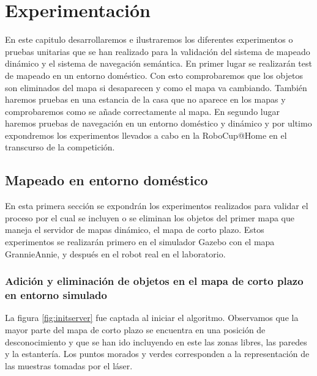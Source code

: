 \chapter{Experimentación}
\label{cap:experimentacion}
En este capitulo desarrollaremos e ilustraremos los diferentes experimentos o pruebas unitarias que se han realizado para la validación del sistema de mapeado dinámico y el sistema de navegación semántica. En primer lugar se realizarán test de mapeado en un entorno doméstico. Con esto comprobaremos que los objetos son eliminados del mapa si desaparecen y como el mapa va cambiando. También haremos pruebas en una estancia de la casa que no aparece en los mapas y comprobaremos como se añade correctamente al mapa. En segundo lugar haremos pruebas de navegación en un entorno doméstico y dinámico y por ultimo expondremos los experimentos llevados a cabo en la RoboCup@Home en el transcurso de la competición.

\section {Mapeado en entorno doméstico}
\label{cap:mapeadodomestico}
En esta primera sección se expondrán los experimentos realizados para validar el proceso por el cual se incluyen o se eliminan los objetos del primer mapa que maneja el servidor de mapas dinámico, el mapa de corto plazo. Estos experimentos se realizarán primero en el simulador Gazebo con el mapa GrannieAnnie, y después en el robot real en el laboratorio.

\subsection {Adición y eliminación de objetos en el mapa de corto plazo en entorno simulado}
\label{sec:add-deleteobjects}

La figura \ref{fig:initserver} fue captada al iniciar el algoritmo. Observamos que la mayor parte del mapa de corto plazo se encuentra en una posición de desconocimiento y que se han ido incluyendo en este las zonas libres, las paredes y la estantería. Los puntos morados y verdes corresponden a la representación de las muestras tomadas por el láser.

